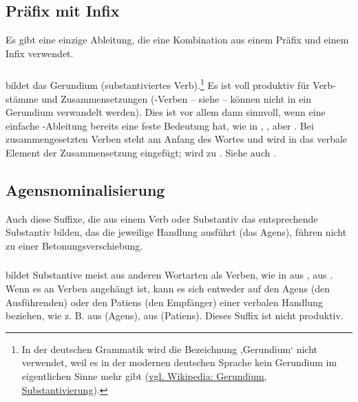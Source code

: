 \subsection{Präfix mit Infix} Es gibt eine einzige Ableitung, die eine Kombination aus einem Präfix und einem Infix verwendet.

\subsubsection{}  bildet das Gerundium (substantiviertes Verb).\footnote{In der deutschen Grammatik wird die Bezeichnung ,Gerundium‘ nicht verwendet, weil es in der modernen deutschen Sprache kein Gerundium im eigentlichen Sinne mehr gibt (\href{https://de.wikipedia.org/wiki/Gerundium}{vgl. Wikipedia: Gerundium}, \href{https://de.wikipedia.org/wiki/Substantivierung}{Substantivierung}).} Es ist voll produktiv für Verb-stämme und Zusammensetzungen (-Verben -- siehe  -- können nicht in ein Gerundium verwandelt werden). Dies ist vor allem dann sinnvoll, wenn eine einfache -Ableitung bereits eine feste Bedeutung hat, wie in  ,  , aber  . Bei zusammengesetzten Verben steht  am Anfang des Wortes und  wird in das verbale Element der Zusammensetzung eingefügt;  wird zu . Siehe auch
.
\label{lingop:gerund}

\subsection{Agensnominalisierung} Auch diese Suffixe, die aus einem Verb oder Substantiv das entsprechende Substantiv bilden, das die jeweilige Handlung ausführt (das Agens), führen nicht zu einer Betonungsverschiebung.

\subsubsection{} 
 bildet Substantive meist aus anderen Wortarten als Verben, wie in   aus  ,   aus  . Wenn es an Verben angehängt ist, kann es sich entweder auf den Agens (den Ausführenden) oder den Patiens (den Empfänger) einer verbalen Handlung beziehen, wie z. B.   aus   (Agens),   aus   (Patiens). Dieses Suffix ist nicht produktiv.

